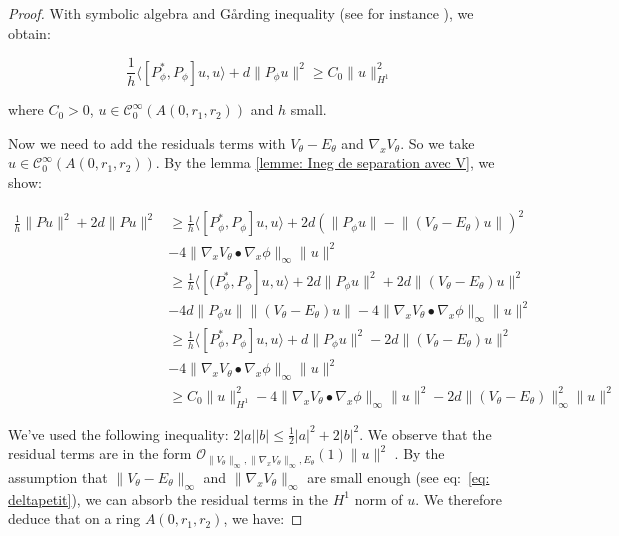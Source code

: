 \documentclass[leqno,11pt,letterpaper, english]{amsart}
\newcommand{\nn}{\nonumber}
\theoremstyle{plain}
\theoremstyle{definition}
\numberwithin{equation}{section}
\begin{document}
\begin{proof}
With symbolic algebra and Gårding inequality (see for instance \cite{alinhac2007pseudo}), we obtain:

\begin{equation}
\label{eq:Carleman_laplacien_libre}
    \frac{1}{h}\langle\left[ P_{\phi}^\ast  , P_{\phi}  \right]u,u\rangle +d\|P_{\phi} u \|^2 \geq C_0\|u\|_{H^1}^2
\end{equation}

where $C_0>0$, $u \in \mathcal{C}_0^\infty(A(0,r_1,r_2))$ and $h$ small.

Now we need to add the residuals terms  with $V_{\theta}-E_{\theta}$ and $\nabla_x V_\theta$. So we take $u \in \mathcal{C}_0^\infty(A(0,r_1,r_2))$. By the lemma \ref{lemme: Ineg de separation avec V}, we show:

\begin{align}
    \frac{1}{h} \lVert Pu\rVert^2 +2d\lVert Pu\rVert^2 &\geq \frac{1}{h}\langle\left[ P_{\phi}^\ast  , P_{\phi}  \right]u,u\rangle + 2d(\lVert P_{\phi} u\rVert-\lVert (V_{\theta}-E_{\theta})u\rVert)^2 \nn\\
    &-4\lVert \nabla_x V_\theta\bullet \nabla_x\phi \rVert_\infty \lVert u\rVert^2  \nn\\
    &\geq\frac{1}{h}\langle\left[ (P_{\phi}^\ast  , P_{\phi}  \right]u,u\rangle + 2d\lVert P_{\phi} u\rVert^2+2d\lVert (V_{\theta}-E_{\theta})u\rVert^2  \nn\\
    &-4d\lVert P_{\phi} u\rVert\lVert (V_{\theta}-E_{\theta})u\rVert-4\lVert \nabla_x V_\theta\bullet \nabla_x\phi \rVert_\infty \lVert u\rVert^2  \nn\\
    &\geq\frac{1}{h}\langle\left[ P_{\phi}^\ast  , P_{\phi}  \right]u,u\rangle + d\lVert P_{\phi} u\rVert^2-2d\lVert (V_{\theta}-E_{\theta})u\rVert^2  \nn\\
    &-4\lVert \nabla_x V_\theta\bullet \nabla_x\phi \rVert_\infty \lVert u\rVert^2  \nn\\
    &\geq C_0\|u\|_{H^1}^2 -4\lVert \nabla_x V_\theta\bullet \nabla_x\phi \rVert_\infty \lVert u\rVert^2 - 2d\lVert (V_{\theta}-E_{\theta})\rVert_\infty^2 \lVert u\rVert^2
\end{align}

We've used the following inequality: $2|a||b| \leq \frac{1}{2}|a|^2 + 2|b|^2$.
We observe that the residual terms are in the form $ \mathcal{O}_{\|V_{\theta}\|_{\infty},\|\nabla_x V_{\theta}\|_{\infty},E_\theta}(1)\lVert u\rVert^2$ . By the assumption that $\|V_{\theta}-E_\theta\|_{\infty}$ and $\|\nabla_x V_{\theta}\|_{\infty}$ are small enough (see eq:~\ref{eq: deltapetit}), we can absorb the residual terms in the $H^1$ norm of $u$. We therefore deduce that on a ring $A(0,r_1,r_2)$, we have:


\end{proof}
\end{document}
